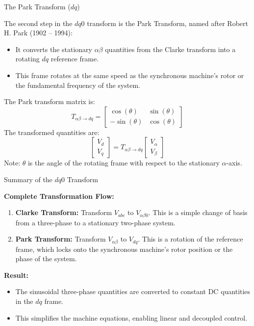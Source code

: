\begin{frame}[allowframebreaks]{The Park Transform ($dq$)}

The second step in the $dq0$ transform is the Park Transform, named after Robert H. Park (1902 – 1994): 
\begin{itemize}
    \item It converts the stationary $\alpha\beta$ quantities from the Clarke transform into a rotating $dq$ reference frame.
    \item This frame rotates at the same speed as the synchronous machine's rotor or the fundamental frequency of the system.
\end{itemize}

The Park transform matrix is:
    $$
    T_{\alpha\beta \to dq} = \begin{bmatrix}
    \cos(\theta) & \sin(\theta) \\
    -\sin(\theta) & \cos(\theta)
    \end{bmatrix}
    $$
The transformed quantities are:
    $$
    \begin{bmatrix}
    V_d \\ V_q
    \end{bmatrix} = T_{\alpha\beta \to dq} \begin{bmatrix}
    V_\alpha \\ V_\beta
    \end{bmatrix}
    $$
Note: $\theta$ is the angle of the rotating frame with respect to the stationary $\alpha$-axis.
\end{frame}

\begin{frame}{Summary of the $dq0$ Transform}

\textbf{Complete Transformation Flow:}
\begin{enumerate}
    \item \textbf{Clarke Transform:} Transform $V_{abc}$ to $V_{\alpha\beta0}$. This is a simple change of basis from a three-phase to a stationary two-phase system.
    \item \textbf{Park Transform:} Transform $V_{\alpha\beta}$ to $V_{dq}$. This is a rotation of the reference frame, which locks onto the synchronous machine's rotor position or the phase of the system.
\end{enumerate}

\textbf{Result:}
\begin{itemize}
    \item The sinusoidal three-phase quantities are converted to constant DC quantities in the $dq$ frame.
    \item This simplifies the machine equations, enabling linear and decoupled control.
\end{itemize}
\end{frame}